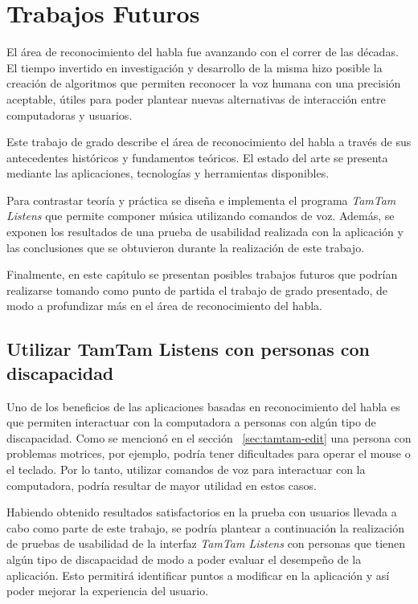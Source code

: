 \chapter{Trabajos Futuros}
\label{sec:trabajos-futuros}

El \'area de reconocimiento del habla fue avanzando con el correr de las d\'ecadas. El tiempo invertido
en investigaci\'on y desarrollo de la misma hizo posible la creaci\'on de algoritmos que permiten
reconocer la voz humana con una precisi\'on aceptable, \'utiles para poder plantear nuevas alternativas
de interacci\'on entre computadoras y usuarios. 

Este trabajo de grado describe el \'area de reconocimiento del habla a trav\'es de sus antecedentes
hist\'oricos y fundamentos te\'oricos. El estado del arte se presenta mediante las aplicaciones, tecnolog\'ias 
y herramientas disponibles.

Para contrastar teor\'ia y pr\'actica se dise\~na e implementa el programa \emph{TamTam Listens} que permite 
componer m\'usica utilizando comandos de voz. Adem\'as, se exponen los resultados de una prueba de usabilidad
realizada con la aplicaci\'on y las conclusiones que se obtuvieron durante la realizaci\'on de este trabajo. 

Finalmente, en este cap{\'\i}tulo se presentan posibles trabajos futuros que podr\'ian realizarse tomando 
como punto de partida el trabajo de grado presentado, de modo a profundizar m\'as en el \'area de reconocimiento del habla.

\section{Utilizar TamTam Listens con personas con discapacidad}

Uno de los beneficios de las aplicaciones basadas en reconocimiento del habla es que permiten  interactuar con la computadora a personas con alg\'un tipo de discapacidad. Como se mencion\'o en el secci\'on~
\ref{sec:tamtam-edit} una persona con problemas motrices, por ejemplo, podr\'ia tener dificultades para 
operar el mouse o el teclado. 
Por lo tanto, utilizar comandos de voz para interactuar con la computadora, podr\'ia resultar de mayor 
utilidad en estos casos.

Habiendo obtenido resultados satisfactorios en la prueba con usuarios llevada a cabo como parte de este 
trabajo, se podr\'ia plantear a continuaci\'on la realizaci\'on de pruebas de usabilidad de la interfaz 
\emph{TamTam Listens} con personas que tienen alg\'un tipo de discapacidad de modo a poder evaluar el 
desempe\~no de la aplicaci\'on. 
Esto permitir\'a identificar puntos a modificar en la aplicaci\'on y as\'i poder mejorar la experiencia del
usuario.

